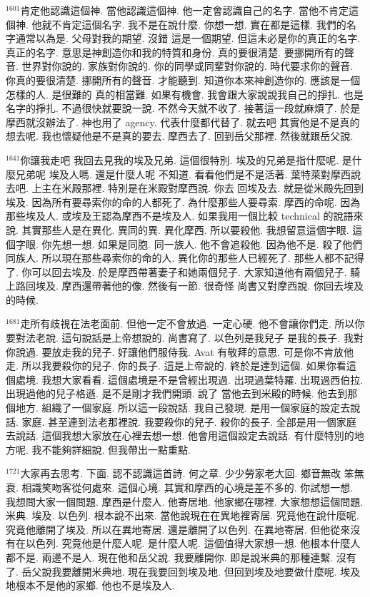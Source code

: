 \documentclass{book}
\begin{document}
$^{1601}$肯定他認識這個神.
當他認識這個神.
他一定會認識自己的名字.
當他不肯定這個神.
他就不肯定這個名字.
我不是在說什麼.
你想一想.
實在都是這樣.
我們的名字通常以為是.
父母對我的期望.
沒錯 這是一個期望.
但這未必是你的真正的名字.
真正的名字.
意思是神創造你和我的特質和身份.
真的要很清楚.
要挪開所有的聲音.
世界對你說的.
家族對你說的.
你的同學或同輩對你說的.
時代要求你的聲音.
你真的要很清楚.
挪開所有的聲音.
才能聽到.
知道你本來神創造你的.
應該是一個怎樣的人.
是很難的 真的相當難.
如果有機會.
我會跟大家說說我自己的掙扎.
也是名字的掙扎.
不過很快就要說一說.
不然今天就不收了.
接著這一段就麻煩了.
於是摩西就沒辦法了.
神也用了 agency.
代表什麼都代替了.
就去吧 其實他是不是真的想去呢.
我也懷疑他是不是真的要去.
摩西去了.
回到岳父那裡.
然後就跟岳父說.

$^{1641}$你讓我走吧 我回去見我的埃及兄弟.
這個很特別.
埃及的兄弟是指什麼呢.
是什麼兄弟呢 埃及人嗎.
還是什麼人呢 不知道.
看看他們是不是活著.
葉特萊對摩西說 去吧.
上主在米殿那裡.
特別是在米殿對摩西說.
你去 回埃及去.
就是從米殿先回到埃及.
因為所有要尋索你的命的人都死了.
為什麼那些人要尋索.
摩西的命呢.
因為那些埃及人.
或埃及王認為摩西不是埃及人.
如果我用一個比較 technical 的說語來說.
其實那些人是在異化.
異同的異.
異化摩西.
所以要殺他.
我想留意這個字眼.
這個字眼.
你先想一想.
如果是同胞.
同一族人.
他不會追殺他.
因為他不是.
殺了他們同族人.
所以現在那些尋索你的命的人.
異化你的那些人已經死了.
那些人都不記得了.
你可以回去埃及.
於是摩西帶著妻子和她兩個兒子.
大家知道他有兩個兒子.
騎上路回埃及.
摩西還帶著他的像.
然後有一節.
很奇怪 尚書又對摩西說.
你回去埃及的時候.

$^{1681}$走所有歧視在法老面前.
但他一定不會放過.
一定心硬.
他不會讓你們走.
所以你要對法老說.
這句說話是上帝想說的.
尚書寫了.
以色列是我兒子 是我的長子.
我對你說過.
要放走我的兒子.
好讓他們服侍我.
Avat 有敬拜的意思.
可是你不肯放他走.
所以我要殺你的兒子.
你的長子.
這是上帝說的.
終於是達到這個.
如果你看這個處境.
我想大家看看.
這個處境是不是曾經出現過.
出現過葉特羅.
出現過西伯拉.
出現過他的兒子格遜.
是不是剛才我們開頭.
說了 當他去到米殿的時候.
他去到那個地方.
組織了一個家庭.
所以這一段說話.
我自己發現.
是用一個家庭的設定去說話.
家庭.
甚至連到法老那裡說.
我要殺你的兒子.
殺你的長子.
全部是用一個家庭去說話.
這個我想大家放在心裡去想一想.
他會用這個設定去說話.
有什麼特別的地方呢.
我不能夠詳細說.
但我帶出一點重點.

$^{1721}$大家再去思考.
下面.
認不認識這首詩.
何之章.
少少勞家老大回.
鄉音無改 笨無衰.
相識笑吻客從何處來.
這個心境.
其實和摩西的心境是差不多的.
你試想一想.
我想問大家一個問題.
摩西是什麼人.
他寄居地.
他家鄉在哪裡.
大家想想這個問題.
米典.
埃及.
以色列.
根本說不出來.
當他說現在在異地裡寄居.
究竟他在說什麼呢.
究竟他離開了埃及.
所以在異地寄居.
還是離開了以色列.
在異地寄居.
但他從來沒有在以色列.
究竟他是什麼人呢.
是什麼人呢.
這個值得大家想一想.
他根本什麼人都不是.
兩邊不是人.
現在他和岳父說.
我要離開你.
即是說米典的那種連繫.
沒有了.
岳父說我要離開米典地.
現在我要回到埃及地.
但回到埃及地要做什麼呢.
埃及地根本不是他的家鄉.
他也不是埃及人.
\end{document}
